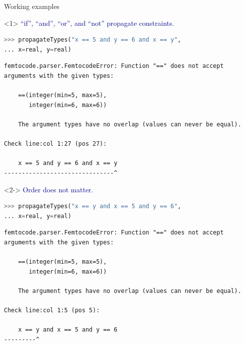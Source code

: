 \documentclass{beamer}
\begin{document}
\begin{frame}[fragile]{Working examples}
\vspace{0.5 cm}
\begin{onlyenv}<1>
\textcolor{darkblue}{``if'', ``and'', ``or'', and ``not'' propagate constraints.}
\begin{lstlisting}[language=python]
>>> propagateTypes("x == 5 and y == 6 and x == y",
... x=real, y=real)
\end{lstlisting}
\color{red}
\begin{lstlisting}[basicstyle=\ttfamily\scriptsize]
femtocode.parser.FemtocodeError: Function "==" does not accept arguments with the given types:

    ==(integer(min=5, max=5),
       integer(min=6, max=6))

    The argument types have no overlap (values can never be equal).

Check line:col 1:27 (pos 27):

    x == 5 and y == 6 and x == y
-------------------------------^
\end{lstlisting}
\end{onlyenv}
\begin{onlyenv}<2->
\textcolor{darkblue}{Order does not matter.}
\begin{lstlisting}[language=python]
>>> propagateTypes("x == y and x == 5 and y == 6",
... x=real, y=real)
\end{lstlisting}
\color{red}
\begin{lstlisting}[basicstyle=\ttfamily\scriptsize]
femtocode.parser.FemtocodeError: Function "==" does not accept arguments with the given types:

    ==(integer(min=5, max=5),
       integer(min=6, max=6))

    The argument types have no overlap (values can never be equal).

Check line:col 1:5 (pos 5):

    x == y and x == 5 and y == 6
---------^
\end{lstlisting}
\end{onlyenv}

\end{frame}
\end{document}
